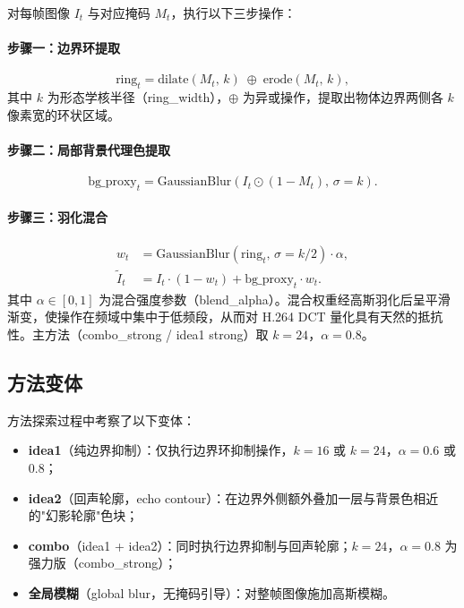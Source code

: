 \documentclass[UTF8,a4paper,12pt]{ctexart}
\begin{document}
对每帧图像 $I_t$ 与对应掩码 $M_t$，执行以下三步操作：

\paragraph{步骤一：边界环提取}
\begin{equation}
  \text{ring}_t = \text{dilate}(M_t,\, k) \;\oplus\; \text{erode}(M_t,\, k),
\end{equation}
其中 $k$ 为形态学核半径（ring\_width），$\oplus$ 为异或操作，提取出物体边界两侧各 $k$ 像素宽的环状区域。

\paragraph{步骤二：局部背景代理色提取}
\begin{equation}
  \text{bg\_proxy}_t = \text{GaussianBlur}\!\left(I_t \odot (1 - M_t),\, \sigma = k\right).
\end{equation}

\paragraph{步骤三：羽化混合}
\begin{align}
  w_t &= \text{GaussianBlur}(\text{ring}_t,\, \sigma = k/2) \cdot \alpha, \\
  \tilde{I}_t &= I_t \cdot (1 - w_t) + \text{bg\_proxy}_t \cdot w_t.
\end{align}
其中 $\alpha \in [0,1]$ 为混合强度参数（blend\_alpha）。混合权重经高斯羽化后呈平滑渐变，使操作在频域中集中于低频段，从而对 H.264 DCT 量化具有天然的抵抗性。主方法（combo\_strong / idea1 strong）取 $k=24$，$\alpha=0.8$。

\subsection{方法变体}

方法探索过程中考察了以下变体：
\begin{itemize}
  \item \textbf{idea1}（纯边界抑制）：仅执行边界环抑制操作，$k=16$ 或 $k=24$，$\alpha=0.6$ 或 $0.8$；
  \item \textbf{idea2}（回声轮廓，echo contour）：在边界外侧额外叠加一层与背景色相近的"幻影轮廓"色块；
  \item \textbf{combo}（idea1 + idea2）：同时执行边界抑制与回声轮廓；$k=24$，$\alpha=0.8$ 为强力版（combo\_strong）；
  \item \textbf{全局模糊}（global blur，无掩码引导）：对整帧图像施加高斯模糊。
\end{itemize}
\end{document}
